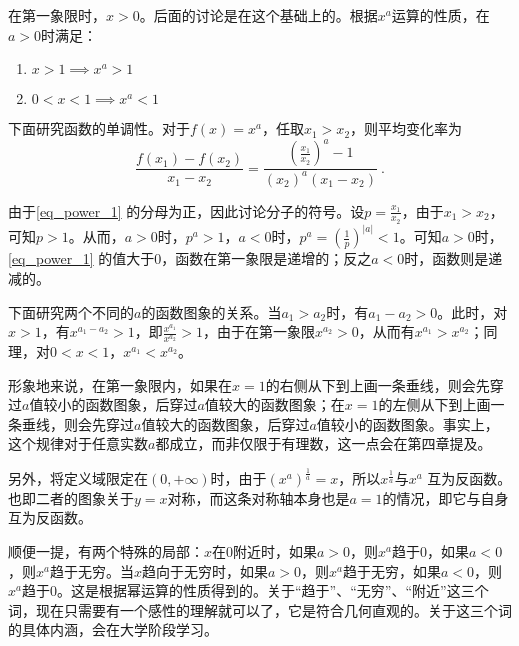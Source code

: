 在第一象限时，$x>0$。后面的讨论是在这个基础上的。根据$x^a$运算的性质，在$a>0$时满足：
\begin{enumerate}
\item $x>1\implies x^a>1$
\item $0<x<1\implies x^a<1$
\end{enumerate}

下面研究函数的单调性。对于$f(x)=x^a$，任取$x_1>x_2$，则平均变化率为
\begin{equation}\label{eq_power_1}
\frac{f(x_1)-f(x_2)}{x_1-x_2}=\frac{\left(\frac{x_1}{x_2}\right)^a-1}{(x_2)^a(x_1-x_2)}~.
\end{equation}

由于\autoref{eq_power_1} 的分母为正，因此讨论分子的符号。设$\displaystyle p=\frac{x_1}{x_2}$，由于$x_1>x_2$，可知$p>1$。从而，$a>0$时，$p^a>1$，$a<0$时，$\displaystyle p^a=\left(\frac{1}{p}\right)^{|a|}<1$。可知$a>0$时，\autoref{eq_power_1} 的值大于$0$，函数在第一象限是递增的；反之$a<0$时，函数则是递减的。

下面研究两个不同的$a$的函数图象的关系。当$a_1>a_2$时，有$a_1-a_2>0$。此时，对$x>1$，有$x^{a_1-a_2}>1$，即$\displaystyle \frac{x^{a_1}}{x^{a_2}}>1$，由于在第一象限$x^{a_2}>0$，从而有$x^{a_1}>x^{a_2}$；同理，对$0<x<1$，$x^{a_1}<x^{a_2}$。

形象地来说，在第一象限内，如果在$x=1$的右侧从下到上画一条垂线，则会先穿过$a$值较小的函数图象，后穿过$a$值较大的函数图象；在$x=1$的左侧从下到上画一条垂线，则会先穿过$a$值较大的函数图象，后穿过$a$值较小的函数图象。事实上，这个规律对于任意实数$a$都成立，而非仅限于有理数，这一点会在第四章提及。

另外，将定义域限定在$(0,+\infty)$时，由于$\displaystyle(x^a)^{\frac{1}{a}}=x$，所以$\displaystyle x^{\frac{1}{a}}$与$x^a$ 互为反函数。也即二者的图象关于$y=x$对称，而这条对称轴本身也是$a=1$的情况，即它与自身互为反函数。

顺便一提，有两个特殊的局部：$x$在$0$附近时，如果$a>0$，则$x^a$趋于$0$，如果$a<0$，则$x^a$趋于无穷。当$x$趋向于无穷时，如果$a>0$，则$x^a$趋于无穷，如果$a<0$，则$x^a$趋于$0$。这是根据幂运算的性质得到的。关于“趋于”、“无穷”、“附近”这三个词，现在只需要有一个感性的理解就可以了，它是符合几何直观的。关于这三个词的具体内涵，会在大学阶段学习。

